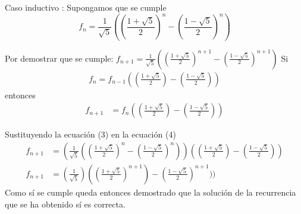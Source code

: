 \documentclass[letterpaper,11pt]{article}
\begin{document}
Caso inductivo : Supongamos que se cumple
\begin{equation}
	f_{n} = \frac{1}{\sqrt{5}} ((\frac{1 + \sqrt{5}}{2})^{n} - (\frac{1 - \sqrt{5}}{2})^{n})
\end{equation}

\qquad\qquad Por demostrar que se cumple: $f_{n+1} = \frac{1}{\sqrt{5}} ((\frac{1 + \sqrt{5}}{2})^{n+1} - (\frac{1 - \sqrt{5}}{2})^{n+1})$ \smallbreak
\qquad\qquad Si 
\begin{equation*}
\begin{aligned}
	f_{n} = f_{n-1} ((\frac{1+\sqrt{5}}{2}) - (\frac{1-\sqrt{5}}{2}))
\end{aligned}
\end{equation*}
\qquad \qquad entonces
\begin{equation}
\begin{aligned}
	f_{n+1} &= f_{n}((\frac{1+\sqrt{5}}{2}) - (\frac{1-\sqrt{5}}{2}))
\end{aligned}
\end{equation}

\qquad \qquad Sustituyendo la ecuación (3) en la ecuación (4)
\begin{equation*}
\begin{aligned}
	f_{n+1} &= (\frac{1}{\sqrt{5}} ((\frac{1 + \sqrt{5}}{2})^{n} - (\frac{1 - \sqrt{5}}{2})^{n}))((\frac{1+\sqrt{5}}{2}) - (\frac{1-\sqrt{5}}{2}))\\
	f_{n+1} &= (\frac{1}{\sqrt{5}}) ((\frac{1 + \sqrt{5}}{2})^{n+1}) - (\frac{1 - \sqrt{5}}{2})^{n+1}))
\end{aligned}
\end{equation*}
\qquad Como sí se cumple queda entonces demostrado que la solución de la recurrencia que se ha obtenido sí es correcta.
\end{document}
